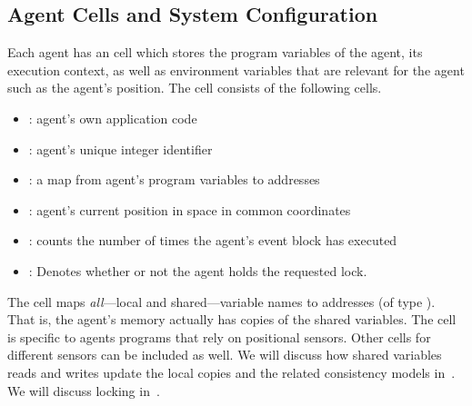  
 


\subsection{Agent Cells and System Configuration}
%
Each agent has an  cell which stores the program variables of the agent, its execution context, as well as environment variables that are relevant for the agent such as the agent's position.  The  cell consists of the following cells.
%
\begin{itemize}
 \item  {}: agent's own application code
 \item {}: agent's unique integer identifier 
 \item {}: a map from agent's program variables to addresses
 \item  {}: agent's current position in space in common coordinates 
 \item  {}: counts the number of times the agent's event block has executed
 \item {}: Denotes whether or not the agent holds the requested lock.
\end{itemize}

%
The  cell maps  \emph{all}---local and shared---variable names to addresses (of type ). That is,  the agent's memory actually has copies of the shared variables.
The  cell is specific to agents programs that rely on positional sensors. Other cells for different sensors can be included as well. 
We will discuss how shared variables reads and writes update the local copies and the related consistency models in~. 
We will discuss locking in~. 

